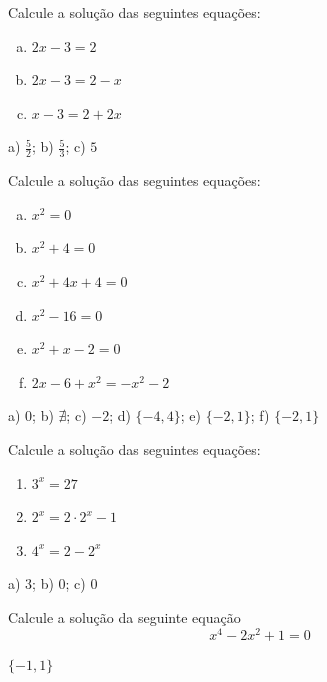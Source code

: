 \begin{exer}
  Calcule a solução das seguintes equações:
  \begin{enumerate}[a)]
  \item $2x - 3 = 2$
  \item $2x - 3 = 2 - x$
  \item $x - 3 = 2 + 2x$
  \end{enumerate}
\end{exer}
\begin{resp}
  a) $\frac{5}{2}$; b) $\frac{5}{3}$; c) $5$
\end{resp}

\begin{exer}
  Calcule a solução das seguintes equações:
  \begin{enumerate}[c)]
  \item $x^2 = 0$
  \item $x^2 + 4 = 0$
  \item $x^2 + 4x + 4 = 0$
  \item $x^2 - 16 = 0$
  \item $x^2 + x - 2 = 0$
  \item $2x - 6 + x^2 = -x^2 - 2$
  \end{enumerate}
\end{exer}
\begin{resp}
  a) $0$; b) $\nexists$; c) $-2$; d) $\{-4,4\}$; e) $\{-2,1\}$; f) $\{-2,1\}$ 
\end{resp}

\begin{exer}
  Calcule a solução das seguintes equações:
  \begin{enumerate}
  \item $3^x = 27$
  \item $2^x = 2\cdot 2^x - 1$
  \item $4^x = 2 - 2^x$
  \end{enumerate}
\end{exer}
\begin{resp}
 a) $3$; b) $0$; c) $0$
\end{resp}

\begin{exer}
  Calcule a solução da seguinte equação
  \begin{equation}
    x^4 - 2x^2 + 1 = 0
  \end{equation}
\end{exer}
\begin{resp}
  $\{-1,1\}$
\end{resp}

